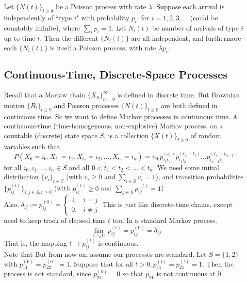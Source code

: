 \documentclass[11pt]{article}
\newcommand{\dur}[3]{{#1}_{#2}^{({#3})}}
\begin{document}
    \proposition[thin]
    Let $\{N(t)\}_{t \geq 0}$ be a Poisson process with rate $\lambda$. Suppose each arrival is independently of ``type $i$" with probability $p_i$, for $i = 1, 2, 3, \hdots$ (could be countably infinite), where $\sum_i p_i = 1$. Let $N_i(t)$ be number of arrivals of type $i$ up to time $t$. Then the different $\{N_i(t)\}$ are all independent, and furthermore each $\{N_i(t)\}$ is itself a Poisson process, with rate $\lambda p_i$.
    
    
    \subsection{Continuous-Time, Discrete-Space Processes}
    Recall that a Markov chain $\{X_n\}_{n=0}^\infty$ is defined in discrete time. But Brownian motion $\{B_t\}_{t\geq 0}$ and Poisson processes $\{N(t)\}_{t \geq 0}$ are both defined in continuous time. So we want to define Markov processes in continuous time.
     A continuous-time (time-homogeneous, non-explosive) Markov process, on a countable (discrete) state space $S$, is a collection $\{X(t)\}_{t \geq 0}$ of random variables such that 
    $$P(X_0 = i_0, X_{t_1} = i_1, X_{t_2} = i_2, \hdots, X_{t_n} = i_n) = v_{i0}\dur{p}{i_0i_1}{t_1}\dur{p}{i_1i_2}{t_2 - t_1} \hdots \dur{p}{i_{n-1}i_n}{t_n - t_{n-1}}$$
    for all $i_0, i_1, \hdots, i_n \in S$ and all $0 < t_1 < t_2 < \hdots < t_n$.
    \property 
    We need some initial distribution $\{v_i\}_{i\in S}$ (with $v_i \geq 0$ and $\sum_{i\in S}v_i = 1$), and transition probabilities $\{\dur{p}{ij}{t}\}_{i, j \in S, t\geq 0}$ (with $\dur{p}{ij}{t} \geq 0$ and $\sum_{j \in S}\dur{p}{ij}{t} = 1$)\\
    Also, $\delta_{ij} := \dur{p}{ij}{0} = \begin{cases}
    	1, & i= j\\
    	0, &i \neq j
    \end{cases}$
    \remark
    This is just like discrete-time chains, except need to keep track of elapsed time $t$ too.
    In a standard Markov process,
    $$\underset{t \searrow 0}{\lim}\, \dur{p}{ij}{t} = \dur{p}{ij}{0} = \delta_{ij}$$
    That is, the mapping $t \mapsto \dur{p}{ij}{t}$ is continuous.\\
    Note that  But from now on, assume our processes are standard.
    \example
    Let $S = \{1,2\}$ with $\dur{p}{11}{0} = \dur{p}{22}{0} = 1$. Suppose that for all $t > 0, \dur{p}{11}{t} = \dur{p}{21}{t} = 1$. Then the process is not standard, since $\dur{p}{21}{0} = 0$ so that $p_{21}$ is not continuous at $0$. 
\end{document}
